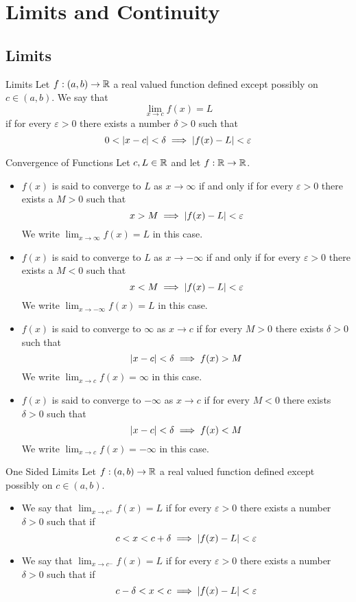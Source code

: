 \documentclass[a4paper]{article}
\begin{document}
\pagebreak
\section{Limits and Continuity}
\subsection{Limits}
\begin{defn}{Limits}{} Let $f:(a,b)\to\mathbb{R}$ a real valued function defined except possibly on $c\in(a,b)$. We say that $$\lim_{x\to c}f(x)=L$$ if for every $\varepsilon>0$ there exists a number $\delta>0$ such that $$0<\abs{x-c}<\delta\implies\abs{f(x)-L}<\varepsilon$$
\end{defn}

\begin{defn}{Convergence of Functions}{} Let $c,L\in\mathbb{R}$ and let $f:\mathbb{R}\to\mathbb{R}$. 
\begin{itemize} 
\item $f(x)$ is said to converge to $L$ as $x\to\infty$ if and only if for every $\varepsilon>0$ there exists a $M>0$ such that $$x>M\implies\abs{f(x)-L}<\varepsilon$$ We write $\lim_{x\to\infty}f(x)=L$ in this case. 
\item $f(x)$ is said to converge to $L$ as $x\to-\infty$ if and only if for every $\varepsilon>0$ there exists a $M<0$ such that $$x<M\implies\abs{f(x)-L}<\varepsilon$$ We write $\lim_{x\to-\infty}f(x)=L$ in this case. 
\item $f(x)$ is said to converge to $\infty$ as $x\to c$ if for every $M>0$ there exists $\delta>0$ such that $$\abs{x-c}<\delta\implies f(x)>M$$ We write $\lim_{x\to c}f(x)=\infty$ in this case. 
\item $f(x)$ is said to converge to $-\infty$ as $x\to c$ if for every $M<0$ there exists $\delta>0$ such that $$\abs{x-c}<\delta\implies f(x)<M$$ We write $\lim_{x\to c}f(x)=-\infty$ in this case. 
\end{itemize}
\end{defn}

\begin{defn}{One Sided Limits}{} Let $f:(a,b)\to\mathbb{R}$ a real valued function defined except possibly on $c\in(a,b)$. 
\begin{itemize}
\item We say that $\lim_{x\to c^+}f(x)=L$ if for every $\varepsilon>0$ there exists a number $\delta>0$ such that if $$c<x<c+\delta\implies\abs{f(x)-L}<\varepsilon$$
\item We say that $\lim_{x\to c^-}f(x)=L$ if for every $\varepsilon>0$ there exists a number $\delta>0$ such that if $$c-\delta<x<c\implies\abs{f(x)-L}<\varepsilon$$
\end{itemize}
\end{defn}
\end{document}
